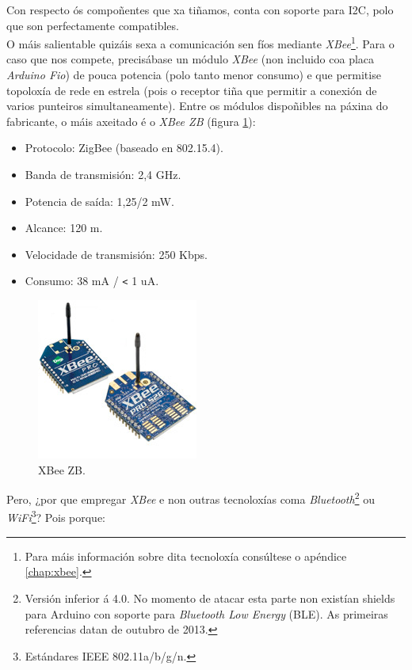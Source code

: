   Con respecto ós compoñentes que xa tiñamos, conta con soporte para I2C, polo
  que son perfectamente compatibles. \\

  O máis salientable quizáis sexa a comunicación sen fíos mediante
  \textit{XBee}\footnote{Para máis información sobre dita tecnoloxía consúltese
  o apéndice \ref{chap:xbee}.}. Para o caso que nos compete,
  precisábase un módulo \textit{XBee} (non incluido coa placa
  \textit{Arduino Fio}) de pouca potencia (polo tanto menor consumo) e que
  permitise topoloxía de rede en estrela (pois o receptor tiña que permitir a
  conexión de varios punteiros simultaneamente). Entre os módulos dispoñibles
  na páxina do fabricante, o máis axeitado é o \textit{XBee ZB} \cite{XbeeZB}
  (figura \ref{figura:XBeeZB}):

  \begin{itemize}
   \item Protocolo: ZigBee (baseado en 802.15.4).
   \item Banda de transmisión: 2,4 GHz.
   \item Potencia de saída: 1,25/2 mW.
   \item Alcance: 120 m.
   \item Velocidade de transmisión: 250 Kbps.
   \item Consumo: 38 mA / \verb|<| 1 uA.
  \end{itemize}

  \begin{figure}[htbp]
   \centering
   \includegraphics[scale=0.6,keepaspectratio=true]{./imagenes/xbee-zb.jpg}
   \caption{XBee ZB.}
   \label{figura:XBeeZB}
  \end{figure}

  Pero, ¿por que empregar \textit{XBee} e non outras tecnoloxías coma
  \textit{Bluetooth}\footnote{Versión inferior á 4.0. No momento de atacar esta
  parte non existían shields para Arduino con soporte para
  \textit{Bluetooth Low Energy} (BLE). As primeiras referencias datan de
  outubro de 2013.} ou
  \textit{WiFi}\footnote{Estándares IEEE 802.11a/b/g/n.}? Pois porque:

